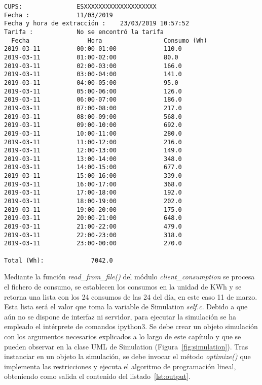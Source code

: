 \begin{lstlisting}[float=ht,numbers=none,caption={Fichero de consumo por horas de Endesa},label={lst:11marzo}]
CUPS:				ESXXXXXXXXXXXXXXXXXXXX
Fecha :				11/03/2019
Fecha y hora de extracción :	23/03/2019 10:57:52
Tarifa :			No se encontró la tarifa
  Fecha 			   Hora 			    Consumo (Wh)
2019-03-11			00:00-01:00				110.0
2019-03-11			01:00-02:00				80.0
2019-03-11			02:00-03:00				166.0
2019-03-11			03:00-04:00				141.0
2019-03-11			04:00-05:00				95.0
2019-03-11			05:00-06:00				126.0
2019-03-11			06:00-07:00				186.0
2019-03-11			07:00-08:00				217.0
2019-03-11			08:00-09:00				568.0
2019-03-11			09:00-10:00				692.0
2019-03-11			10:00-11:00				280.0
2019-03-11			11:00-12:00				216.0
2019-03-11			12:00-13:00				149.0
2019-03-11			13:00-14:00				348.0
2019-03-11			14:00-15:00				677.0
2019-03-11			15:00-16:00				339.0
2019-03-11			16:00-17:00				368.0
2019-03-11			17:00-18:00				192.0
2019-03-11			18:00-19:00				202.0
2019-03-11			19:00-20:00				175.0
2019-03-11			20:00-21:00				648.0
2019-03-11			21:00-22:00				479.0
2019-03-11			22:00-23:00				318.0
2019-03-11			23:00-00:00				270.0

Total (Wh):				7042.0
\end{lstlisting}
Mediante la función \textit{read\_from\_file()} del módulo \textit{client\_consumption} se procesa el fichero de consumo, se establecen los consumos en la unidad de KWh y se retorna una lista con los 24 consumos de las 24 del día, en este caso 11 de marzo. Esta lista será el valor que toma la variable de Simulation \textit{self.c}. Debido a que aún no se dispone de interfaz ni servidor, para ejecutar la simulación se ha empleado el intérprete de comandos ipython3. Se debe crear un objeto simulación con los argumentos necesarios explicados a lo largo de este capítulo y que se pueden observar en la clase UML de Simulation (Figura~\ref{fig:simulation}). Tras instanciar en un objeto la simulación, se debe invocar el método \textit{optimize()} que implementa las restricciones y ejecuta el algoritmo de programación lineal, obteniendo como salida el contenido del listado~\ref{lst:output}.\\

